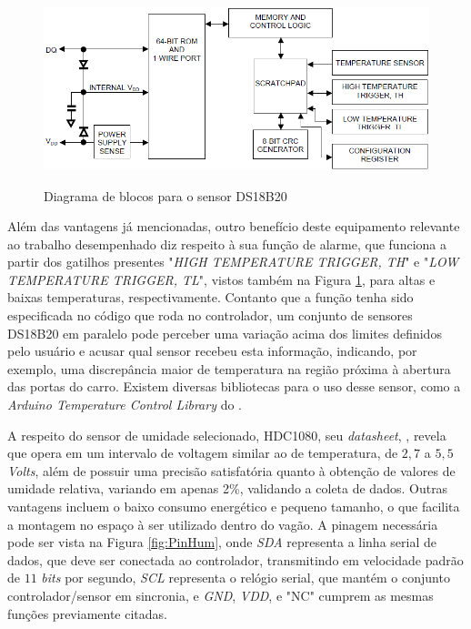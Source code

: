 \documentclass[acronym,symbols,table]{fei}
\begin{document}
\begin{figure}[!htb]
\centering
    \caption{Diagrama de blocos para o sensor DS18B20}
    \includegraphics[width=0.8\linewidth]{Imagens/DiagBlocTemp.png}
    \label{fig:DiagBlocTemp}
\end{figure}

Além das vantagens já mencionadas, outro benefício deste equipamento relevante ao trabalho desempenhado diz respeito à sua função de alarme, que funciona a partir dos gatilhos presentes "\textit{HIGH TEMPERATURE TRIGGER, TH}" e "\textit{LOW TEMPERATURE TRIGGER, TL}", vistos também na Figura \ref{fig:DiagBlocTemp}, para altas e baixas temperaturas, respectivamente. Contanto que a função tenha sido especificada no código que roda no controlador, um conjunto de sensores DS18B20 em paralelo pode perceber uma variação acima dos limites definidos pelo usuário e acusar qual sensor recebeu esta informação, indicando, por exemplo, uma discrepância maior de temperatura na região próxima à abertura das portas do carro. Existem diversas bibliotecas para o uso desse sensor, como a \textit{Arduino Temperature Control Library} do \textcite{Arduino-Temperature-Control-Library}.

A respeito do sensor de umidade selecionado, HDC1080, seu \textit{datasheet}, \textcite{HDC1080}, revela que opera em um intervalo de voltagem similar ao de temperatura, de $2,7$ a $5,5$ \textit{Volts}, além de possuir uma precisão satisfatória quanto à obtenção de valores de umidade relativa, variando em apenas 2\%, validando a coleta de dados. Outras vantagens incluem o baixo consumo energético e pequeno tamanho, o que facilita a montagem no espaço à ser utilizado dentro do vagão. A pinagem necessária pode ser vista na Figura \ref{fig:PinHum}, onde \textit{SDA} representa a linha serial de dados, que deve ser conectada ao controlador, transmitindo em velocidade padrão de $11$ \textit{bits} por segundo, \textit{SCL} representa o relógio serial, que mantém o conjunto controlador/sensor em sincronia, e \textit{GND}, \textit{VDD}, e "NC" cumprem as mesmas funções previamente citadas.
\end{document}
